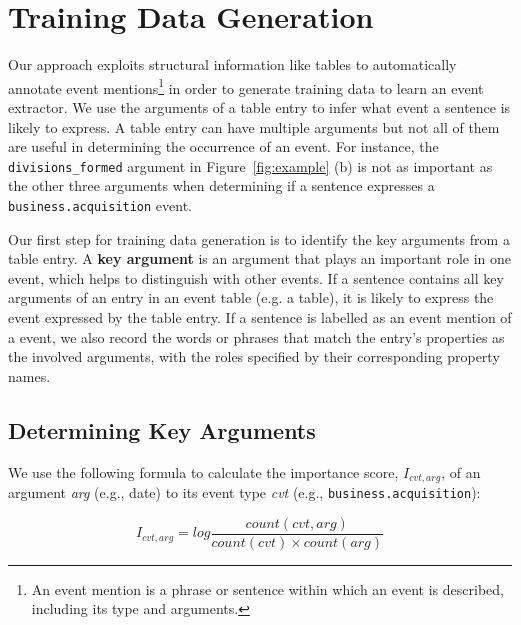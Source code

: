 \section{Training Data Generation}
Our approach exploits structural information like \FB \CVT tables to  automatically annotate event mentions\footnote{An event mention is a
phrase or sentence within which an event is described, including its type and arguments.} in order to generate training data to learn an
event extractor. We use the arguments of a \CVT table entry to infer what event a sentence is likely to express. A \CVT table entry can
have multiple arguments but not all of them are useful in determining the occurrence of an event. For instance, the
\texttt{divisions\_formed} argument in Figure~\ref{fig:example} (b) is not as important as the other three arguments when determining if a
sentence expresses a \texttt{business.acquisition} event.


Our first step for training data generation is to identify the key arguments from a \CVT table entry. A \textbf{key argument} is an
argument that plays an important role in one event, which helps to distinguish with other events. If a sentence contains all key arguments
of an entry in an event table (e.g. a \CVT table), it is likely to express the event expressed by the table entry. If a sentence is
labelled as an event mention of a \CVT event, we also record the words or phrases that match the entry's properties as the involved
arguments, with the roles specified by their corresponding property names.


\subsection{Determining Key Arguments}
We use the following formula to calculate the importance score, $I_{cvt, arg}$, of an argument \emph{arg} (e.g., date) to its event type
\emph{cvt} (e.g., \texttt{business.acquisition}):

\begin{equation}
	I_{cvt, arg} = log \frac{count(cvt, arg)}{count(cvt) \times count(arg)}
\end{equation}


